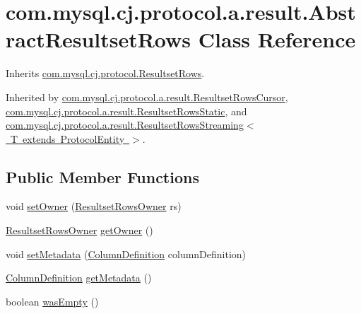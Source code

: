 \hypertarget{classcom_1_1mysql_1_1cj_1_1protocol_1_1a_1_1result_1_1_abstract_resultset_rows}{}\section{com.\+mysql.\+cj.\+protocol.\+a.\+result.\+Abstract\+Resultset\+Rows Class Reference}
\label{classcom_1_1mysql_1_1cj_1_1protocol_1_1a_1_1result_1_1_abstract_resultset_rows}


Inherits \mbox{\hyperlink{interfacecom_1_1mysql_1_1cj_1_1protocol_1_1_resultset_rows}{com.\+mysql.\+cj.\+protocol.\+Resultset\+Rows}}.



Inherited by \mbox{\hyperlink{classcom_1_1mysql_1_1cj_1_1protocol_1_1a_1_1result_1_1_resultset_rows_cursor}{com.\+mysql.\+cj.\+protocol.\+a.\+result.\+Resultset\+Rows\+Cursor}}, \mbox{\hyperlink{classcom_1_1mysql_1_1cj_1_1protocol_1_1a_1_1result_1_1_resultset_rows_static}{com.\+mysql.\+cj.\+protocol.\+a.\+result.\+Resultset\+Rows\+Static}}, and \mbox{\hyperlink{classcom_1_1mysql_1_1cj_1_1protocol_1_1a_1_1result_1_1_resultset_rows_streaming}{com.\+mysql.\+cj.\+protocol.\+a.\+result.\+Resultset\+Rows\+Streaming$<$ T extends Protocol\+Entity $>$}}.

\subsection*{Public Member Functions}
\begin{DoxyCompactItemize}
\item 
void \mbox{\hyperlink{classcom_1_1mysql_1_1cj_1_1protocol_1_1a_1_1result_1_1_abstract_resultset_rows_aa020316d48045e8ade0aaeddf40d1de6}{set\+Owner}} (\mbox{\hyperlink{interfacecom_1_1mysql_1_1cj_1_1protocol_1_1_resultset_rows_owner}{Resultset\+Rows\+Owner}} rs)
\item 
\mbox{\hyperlink{interfacecom_1_1mysql_1_1cj_1_1protocol_1_1_resultset_rows_owner}{Resultset\+Rows\+Owner}} \mbox{\hyperlink{classcom_1_1mysql_1_1cj_1_1protocol_1_1a_1_1result_1_1_abstract_resultset_rows_ae7b769392c5668dabf45c80e36ec216e}{get\+Owner}} ()
\item 
void \mbox{\hyperlink{classcom_1_1mysql_1_1cj_1_1protocol_1_1a_1_1result_1_1_abstract_resultset_rows_a13f4342893e5c2c6ca06237af1e585a7}{set\+Metadata}} (\mbox{\hyperlink{interfacecom_1_1mysql_1_1cj_1_1protocol_1_1_column_definition}{Column\+Definition}} column\+Definition)
\item 
\mbox{\hyperlink{interfacecom_1_1mysql_1_1cj_1_1protocol_1_1_column_definition}{Column\+Definition}} \mbox{\hyperlink{classcom_1_1mysql_1_1cj_1_1protocol_1_1a_1_1result_1_1_abstract_resultset_rows_af9d20b6a50813a1c1bf8695e68f46467}{get\+Metadata}} ()
\item 
boolean \mbox{\hyperlink{classcom_1_1mysql_1_1cj_1_1protocol_1_1a_1_1result_1_1_abstract_resultset_rows_ae97f8b33948868aab21df7320f9f91f4}{was\+Empty}} ()
\end{DoxyCompactItemize}

